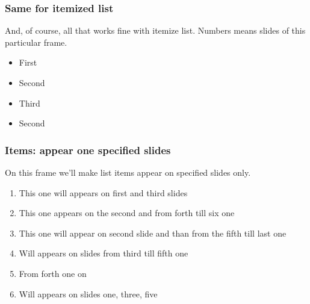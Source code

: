 \begin{frame}
    \frametitle{Same for itemized list}
    And, of course, all that works fine with itemize list. Numbers means slides of this particular frame.
    \begin{itemize}
	\item<1-> First
	\item<2-> Second
	\item<3-> Third
	\item<2-> Second
    \end{itemize}
\end{frame}

\begin{frame}
    \frametitle{Items: appear one specified slides}
    On this frame we'll make list items appear on specified slides only. 
    \begin{enumerate}
	\item<1,3> This one will appears on first and third slides
	\item<2,4-6> This one appears on the second and from forth till six one
	\item<2,5-> This one will appear on second slide and than from the fifth till last one
	\item<3-5> Will appears on slides from third till fifth one
	\item<4-> From forth one on
	\item<1,3,5> Will appears on slides one, three, five
    \end{enumerate}
\end{frame}


